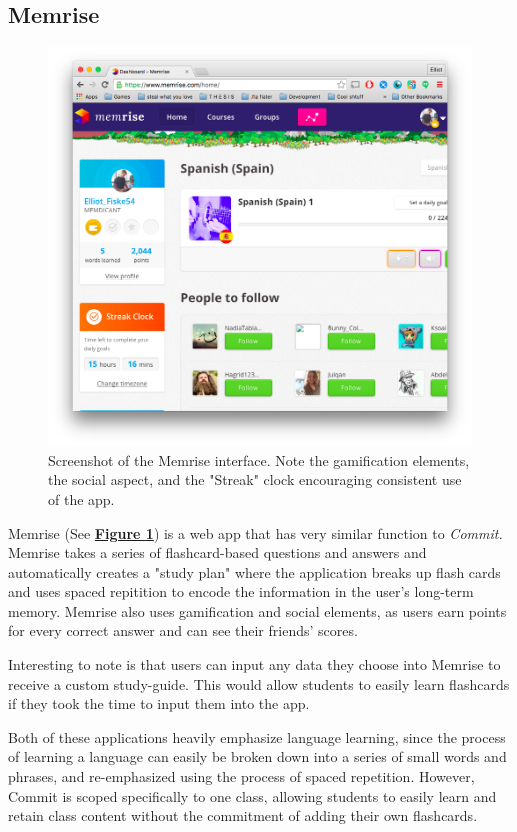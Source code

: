 \subsection{Memrise}

\begin{figure}
	\centering
	\includegraphics[width=0.7\linewidth]{memrise}
	\caption[Memrise]{Screenshot of the Memrise interface. Note the gamification elements, the social aspect, and the "Streak" clock encouraging consistent use of the app.}
	\label{fig:memrise}
\end{figure}

\par Memrise (See \textbf{\hyperref[fig:memrise]{Figure \ref*{fig:memrise}}}) is a web app that has very similar function to \textit{Commit.} Memrise takes a series of flashcard-based questions and answers and automatically creates a "study plan" where the application breaks up flash cards and uses spaced repitition to encode the information in the user's long-term memory. Memrise also uses gamification and social elements, as users earn points for every correct answer and can see their friends' scores.

\par Interesting to note is that users can input any data they choose into Memrise to receive a custom study-guide. This would allow students to easily learn flashcards if they took the time to input them into the app.

\par Both of these applications heavily emphasize language learning, since the process of learning a language can easily be broken down into a series of small words and phrases, and re-emphasized using the process of spaced repetition. However, Commit is scoped specifically to one class, allowing students to easily learn and retain class content without the commitment of adding their own flashcards.

